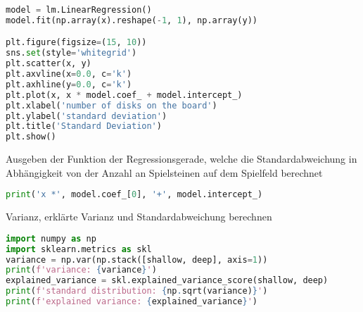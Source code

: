 \begin{lstlisting}[language=Python]
model = lm.LinearRegression()
model.fit(np.array(x).reshape(-1, 1), np.array(y))

plt.figure(figsize=(15, 10))
sns.set(style='whitegrid')
plt.scatter(x, y)
plt.axvline(x=0.0, c='k')
plt.axhline(y=0.0, c='k')
plt.plot(x, x * model.coef_ + model.intercept_)
plt.xlabel('number of disks on the board')
plt.ylabel('standard deviation')
plt.title('Standard Deviation')
plt.show()
\end{lstlisting}

Ausgeben der Funktion der Regressionsgerade, welche die
Standardabweichung in Abhängigkeit von der Anzahl an Spielsteinen auf
dem Spielfeld berechnet

\begin{lstlisting}[language=Python]
print('x *', model.coef_[0], '+', model.intercept_)
\end{lstlisting}

Varianz, erklärte Varianz und Standardabweichung berechnen

\begin{lstlisting}[language=Python]
import numpy as np
import sklearn.metrics as skl
variance = np.var(np.stack([shallow, deep], axis=1))
print(f'variance: {variance}')
explained_variance = skl.explained_variance_score(shallow, deep)
print(f'standard distribution: {np.sqrt(variance)}')
print(f'explained variance: {explained_variance}')
\end{lstlisting}

\begin{lstlisting}[language=Python]
\end{lstlisting}
